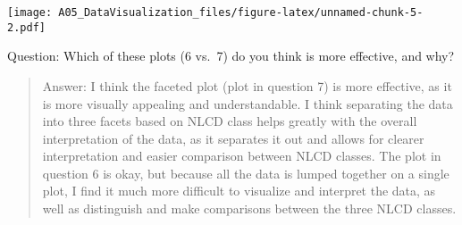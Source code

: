 \documentclass[
]{article}
\newenvironment{Shaded}{\begin{snugshade}}{\end{snugshade}}
\newcommand{\CommentTok}[1]{\textcolor[rgb]{0.56,0.35,0.01}{\textit{#1}}}
\newcommand{\DataTypeTok}[1]{\textcolor[rgb]{0.13,0.29,0.53}{#1}}
\newcommand{\DecValTok}[1]{\textcolor[rgb]{0.00,0.00,0.81}{#1}}
\newcommand{\KeywordTok}[1]{\textcolor[rgb]{0.13,0.29,0.53}{\textbf{#1}}}
\newcommand{\NormalTok}[1]{#1}
\newcommand{\OperatorTok}[1]{\textcolor[rgb]{0.81,0.36,0.00}{\textbf{#1}}}
\newcommand{\StringTok}[1]{\textcolor[rgb]{0.31,0.60,0.02}{#1}}
\begin{document}
\begin{Shaded}
\end{Shaded}

\texttt{[image: A05\_DataVisualization\_files/figure-latex/unnamed-chunk-5-2.pdf]}

Question: Which of these plots (6 vs.~7) do you think is more effective,
and why?

\begin{quote}
Answer: I think the faceted plot (plot in question 7) is more effective,
as it is more visually appealing and understandable. I think separating
the data into three facets based on NLCD class helps greatly with the
overall interpretation of the data, as it separates it out and allows
for clearer interpretation and easier comparison between NLCD classes.
The plot in question 6 is okay, but because all the data is lumped
together on a single plot, I find it much more difficult to visualize
and interpret the data, as well as distinguish and make comparisons
between the three NLCD classes.
\end{quote}
\end{document}
